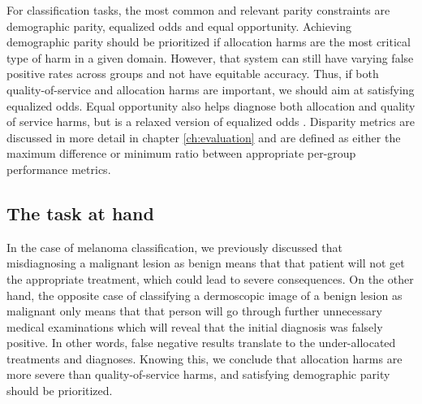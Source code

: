 For classification tasks, the most common and relevant parity constraints are demographic parity, equalized odds and equal opportunity. Achieving demographic parity should be prioritized if allocation harms are the most critical type of harm in a given domain. However, that system can still have varying false positive rates across groups and not have equitable accuracy. Thus, if both quality-of-service and allocation harms are important, we should aim at satisfying equalized odds. Equal opportunity also helps diagnose both allocation and quality of service harms, but is a relaxed version of equalized odds \cite{fairlearn}. Disparity metrics are discussed in more detail in chapter \ref{ch:evaluation} and are defined as either the maximum difference or minimum ratio between appropriate per-group performance metrics.

\subsection{The task at hand}

In the case of melanoma classification, we previously discussed that misdiagnosing a malignant lesion as benign means that that patient will not get the appropriate treatment, which could lead to severe consequences. On the other hand, the opposite case of classifying a dermoscopic image of a benign lesion as malignant only means that that person will go through further unnecessary medical examinations which will reveal that the initial diagnosis was falsely positive. In other words, false negative results translate to the under-allocated treatments and diagnoses. Knowing this, we conclude that allocation harms are more severe than quality-of-service harms, and satisfying demographic parity should be prioritized. 